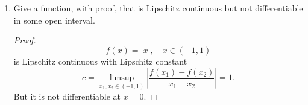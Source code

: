 \begin{enumerate}
\begin{proof}
	is differentiable since its derivative is \(f'(x)=\frac{1}{3}x^{-\frac{2}{3}}\).
	But it is not Lipschitz continuous since
	\[ \frac{|f(x_1)-f(x_2)|}{|x_1-x_2|}=\frac{1}{x_1^{\frac{2}{3}}+x_1^{\frac{1}{3}}x_2^{\frac{1}{3}}+x_2^{\frac{2}{3}}} \]
	is not bounded on \(x_1, x_2\in(-1,1)\) so that the Lipschitz constant does not exist.
	\end{proof}
	\item Give a function, with proof, that is Lipschitz continuous but not differentiable in some open interval.
	\begin{proof}
	\[ f(x)=|x|, \quad x\in(-1,1) \]
	is Lipschitz continuous with Lipschitz constant
	\[ c=\limsup_{x_1,x_2\in(-1,1)}\left|\frac{f(x_1)-f(x_2)}{x_1-x_2}\right|=1. \]
	But it is not differentiable at \(x=0\).
	\end{proof}
\end{enumerate}


